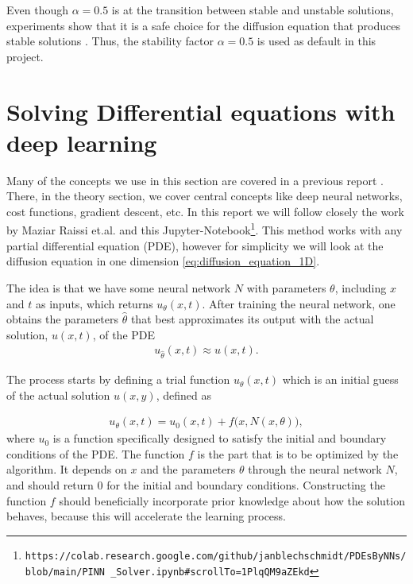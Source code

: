 \documentclass[12pt]{extarticle}
\begin{document}
Even though $\alpha = 0.5$ is at the transition between stable and unstable solutions, experiments show that it is a safe choice for the diffusion equation that produces stable solutions \cite{Linge2017}. Thus, the stability factor $\alpha=0.5$ is used as default in this project. 

\section{Solving Differential equations with deep learning}
Many of the concepts we use in this section are covered in a previous report \cite{project2}. There, in the theory section, we cover central concepts like deep neural networks, cost functions, gradient descent, etc. In this report we will follow closely the work by Maziar Raissi et.al. \cite{raissi2017physics} and this Jupyter-Notebook\footnote{\texttt{https://colab.research.google.com/github/janblechschmidt/PDEsByNNs/blob/main/PINN \_Solver.ipynb\#scrollTo=1PlqQM9aZEkd}}. This method works with any partial differential equation (PDE), however for simplicity we will look at the diffusion equation in one dimension \eqref{eq:diffusion_equation_1D}. 

The idea is that we have some neural network $N$ with parameters $\theta$, including $x$ and $t$ as inputs, which returns $u_{\theta}(x,t)$. After training the neural network, one obtains the parameters $\hat{\theta}$ that best approximates its output with the actual solution, $u(x,t)$, of the PDE
\begin{align*}
	u_{\hat{\theta}} (x, t) \approx u(x, t).
\end{align*}

The process starts by defining a trial function $u_{\theta}(x,t)$ which is an initial guess of the actual solution $u(x,y)$, defined as

\begin{align}
	u_{\theta}(x,t) = u_0(x, t) + f\big(x, N(x,\theta)\big),
	\label{eq:NN_model}
\end{align}
where $u_0$ is a function specifically designed to satisfy the initial and boundary conditions of the PDE. The function $f$ is the part that is to be optimized by the algorithm. It depends on $x$ and the parameters $\theta$ through the neural network $N$, and should return 0 for the initial and boundary conditions. Constructing the function $f$ should beneficially incorporate prior knowledge about how the solution behaves, because this will accelerate the learning process.
\end{document}
